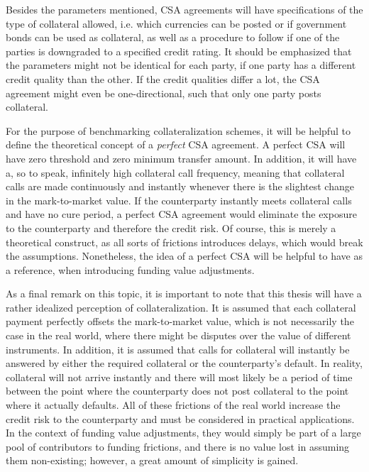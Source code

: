 \documentclass[main.tex]{subfiles}
\begin{document}
        Besides the parameters mentioned, CSA agreements will have specifications of the type of collateral allowed,
        i.e. which currencies can be posted or if government bonds can be used as collateral,
        as well as a procedure to follow if one of the parties is downgraded to a specified credit rating.
        It should be emphasized that the parameters might not be identical for each party,
        if one party has a different credit quality than the other.
        If the credit qualities differ a lot, the CSA agreement might even be one-directional,
        such that only one party posts collateral.

        For the purpose of benchmarking collateralization schemes, 
        it will be helpful to define the theoretical concept of a \textit{perfect} CSA agreement.
        A perfect CSA will have zero threshold and zero minimum transfer amount.
        In addition, it will have a, so to speak, infinitely high collateral call frequency,
        meaning that collateral calls are made continuously and instantly 
        whenever there is the slightest change in the mark-to-market value. 
        If the counterparty instantly meets collateral calls and have no cure period,
        a perfect CSA agreement would eliminate the exposure to the counterparty
        and therefore the credit risk.
        Of course, this is merely a theoretical construct, as all sorts of frictions introduces delays,
        which would break the assumptions.
        Nonetheless, the idea of a perfect CSA will be helpful to have as a reference,
        when introducing funding value adjustments.

        As a final remark on this topic,
        it is important to note that this thesis will have a rather idealized perception of collateralization.
        It is assumed that each collateral payment perfectly offsets the mark-to-market value,
        which is not necessarily the case in the real world,
        where there might be disputes over the value of different instruments.
        In addition, it is assumed that calls for collateral will instantly be answered
        by either the required collateral or the counterparty's default. 
        In reality, collateral will not arrive instantly and there will most likely be a period of time between
        the point where the counterparty does not post collateral to the point where it actually defaults.
        All of these frictions of the real world increase the credit risk to the counterparty
        and must be considered in practical applications. 
        In the context of funding value adjustments, 
        they would simply be part of a large pool of contributors to funding frictions,
        and there is no value lost in assuming them non-existing;
        however, a great amount of simplicity is gained.
\end{document}
